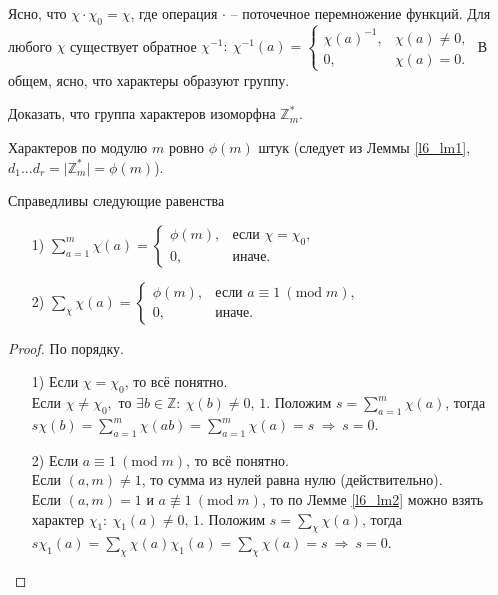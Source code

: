 Ясно, что $\chi \cdot \chi_0 = \chi$, где операция $\cdot$ -- поточечное перемножение функций. Для любого $\chi$ существует обратное $\chi^{-1}: \ \chi^{-1}(a) = \begin{cases} 
	\chi(a)^{-1}, & \chi(a) \ne 0, \\ 
	0, & \chi(a) = 0. 
\end{cases}$ В общем, ясно, что характеры образуют группу.

\begin{problem} \label{l6_task}
	Доказать, что группа характеров изоморфна $\mathbb{Z}_m^\ast$.
\end{problem}

Характеров по модулю $m$ ровно $\phi(m)$ штук (следует из Леммы \ref{l6_lm1}, $d_1 \dots d_r = \lvert \mathbb{Z}_m^\ast \rvert = \phi(m)$).

\begin{lemma} \label{l6_lm3}
	Справедливы следующие равенства
	\begin{enumerate}
		\item[1)] $\displaystyle \sum\limits_{a=1}^m \chi(a) = 
			\begin{cases} 
				\phi(m), & \text{если } \chi=\chi_0, \\ 
				0, & \text{иначе.} 
			\end{cases}$
		\item[2)] $\displaystyle \sum\limits_\chi \chi(a) = 
		\begin{cases} 
			\phi(m), & \text{если } a \equiv 1 \ (\mathrm{mod} \; m), \\ 
			0, & \text{иначе.} 
		\end{cases}$
	\end{enumerate}
\end{lemma}
\begin{proof}
	По порядку.
	\begin{enumerate}
		\item[1)] Если $\chi = \chi_0$, то всё понятно.\\
			Если $\chi \ne \chi_0,$ то $\exists b \in \mathbb{Z}: \ \chi(b) \ne 0, \, 1$. Положим $\displaystyle s = \sum\limits_{a=1}^m \chi(a)$, тогда $\displaystyle s \chi(b) = \sum\limits_{a=1}^m \chi(ab) = \sum\limits_{a=1}^m \chi(a) = s \ \Rightarrow \ s = 0$.
		\item[2)] Если $a \equiv 1 \ (\mathrm{mod} \; m)$, то всё понятно.\\
			Если $(a,m) \ne 1$, то сумма из нулей равна нулю (действительно).\\
			Если $(a,m) = 1$ и $a \not\equiv 1 \ (\mathrm{mod} \; m)$, то по Лемме \ref{l6_lm2} можно взять характер $\chi_1: \ \chi_1(a) \ne 0, \, 1.$ 
			Положим $\displaystyle s = \sum\limits_\chi \chi(a)$, тогда $\displaystyle s \chi_1(a) = \sum\limits_\chi \chi(a)\chi_1(a) = \sum\limits_\chi \chi(a) = s \ \Rightarrow \ s = 0$.
	\end{enumerate}
\end{proof}

